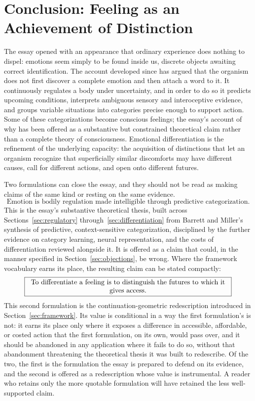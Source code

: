 \documentclass[11pt]{article}
\begin{document}
\section{Conclusion: Feeling as an Achievement of Distinction}

The essay opened with an appearance that ordinary experience does nothing to dispel: emotions seem simply to be found inside us, discrete objects awaiting correct identification. The account developed since has argued that the organism does not first discover a complete emotion and then attach a word to it. It continuously regulates a body under uncertainty, and in order to do so it predicts upcoming conditions, interprets ambiguous sensory and interoceptive evidence, and groups variable situations into categories precise enough to support action. Some of these categorizations become conscious feelings; the essay's account of why has been offered as a substantive but constrained theoretical claim rather than a complete theory of consciousness. Emotional differentiation is the refinement of the underlying capacity: the acquisition of distinctions that let an organism recognize that superficially similar discomforts may have different causes, call for different actions, and open onto different futures.

Two formulations can close the essay, and they should not be read as making claims of the same kind or resting on the same evidence.
\[
\boxed{\text{Emotion is bodily regulation made intelligible through predictive categorization.}}
\]
This is the essay's substantive theoretical thesis, built across Sections~\ref{sec:regulatory} through~\ref{sec:differentiation} from Barrett and Miller's synthesis of predictive, context-sensitive categorization, disciplined by the further evidence on category learning, neural representation, and the costs of differentiation reviewed alongside it. It is offered as a claim that could, in the manner specified in Section~\ref{sec:objections}, be wrong.
Where the framework vocabulary earns its place, the resulting claim can be stated compactly:
\[
\boxed{\parbox{0.85\textwidth}{\centering To differentiate a feeling is to distinguish the futures to which it gives access.}}
\]
This second formulation is the continuation-geometric redescription introduced in Section~\ref{sec:framework}. Its value is conditional in a way the first formulation's is not: it earns its place only where it exposes a difference in accessible, affordable, or costed action that the first formulation, on its own, would pass over, and it should be abandoned in any application where it fails to do so, without that abandonment threatening the theoretical thesis it was built to redescribe. Of the two, the first is the formulation the essay is prepared to defend on its evidence, and the second is offered as a redescription whose value is instrumental. A reader who retains only the more quotable formulation will have retained the less well-supported claim.
\end{document}
